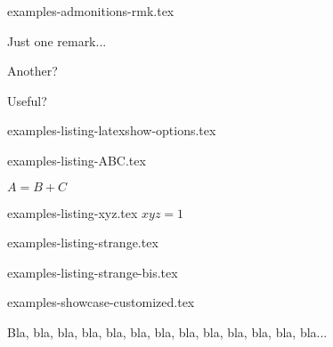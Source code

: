 \begin{filecontents*}[overwrite]{examples-admonitions-rmk.tex}
\begin{tdocrem}
    Just one remark...
\end{tdocrem}

\begin{tdocrem}
    Another?
\end{tdocrem}

\begin{tdocrem}
    Useful?
\end{tdocrem}
\end{filecontents*}


\begin{filecontents*}[overwrite]{examples-listing-latexshow-options.tex}
\end{filecontents*}


\begin{filecontents*}[overwrite]{examples-listing-ABC.tex}
\begin{tdoclatex}[sbs]
    $A = B + C$
\end{tdoclatex}
\end{filecontents*}


\begin{filecontents*}[overwrite]{examples-listing-xyz.tex}
$x y z = 1$
\end{filecontents*}


\begin{filecontents*}[overwrite]{examples-listing-strange.tex}
\begin{tdoclatex}
\end{tdoclatex}
\end{filecontents*}


\begin{filecontents*}[overwrite]{examples-listing-strange-bis.tex}
\begin{tdoclatex}
\end{tdoclatex}
\end{filecontents*}


\begin{filecontents*}[overwrite]{examples-showcase-customized.tex}
\begin{tdocshowcase}[before     = My beginning,
                     after      = My end,
                     col-stripe = red,
                     col-text   = orange!75!black]
    Bla, bla, bla, bla, bla, bla, bla, bla, bla, bla, bla, bla, bla...
\end{tdocshowcase}
\end{filecontents*}


